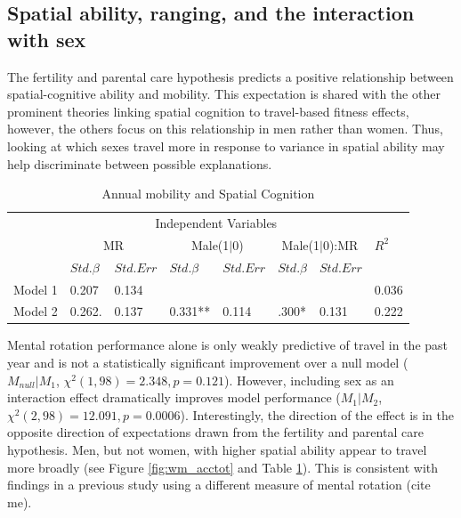 	\subsection{Spatial ability, ranging, and the interaction with sex}
	\label{sec:3.4}
The fertility and parental care hypothesis predicts a positive relationship between spatial-cognitive ability and mobility. This expectation is shared with the other prominent theories linking spatial cognition to travel-based fitness effects, however, the others focus on this relationship in men rather than women.  Thus, looking at which sexes travel more in response to variance in spatial ability may help discriminate between possible explanations.	

\begin{table}[!tb]
\caption {Annual mobility and Spatial Cognition}
\label{tab:wm_spacemob}
  \centering
  \begin{tabular}{| l  ll  ll  ll  l |} 
    \hline   
  & \multicolumn{6}{c}{Independent Variables}& \\    
  & \multicolumn{2}{c}{MR} & \multicolumn{2}{c}{Male(1$|$0)} & \multicolumn{2}{c}{Male(1$|$0):MR} & $R^2$ \\
  & $Std. \beta$ & $Std. Err$ & $Std. \beta$ & $Std. Err$ & $Std. \beta$ & $Std. Err$  & \\
  Model 1 & 0.207\phantom{**} & 0.134\phantom{**} & & & & & 0.036\phantom{**} \\
  Model 2 & 0.262. & 0.137\phantom{**} & 0.331** & 0.114\phantom{**} & .300* & 0.131\phantom{**} & 0.222\\
  \hline 
  \end{tabular}  
{}
\end{table}

Mental rotation performance alone is only weakly predictive of travel in the past year and is not a statistically significant improvement over a null model ($M_{null} | M_1$, $\chi^2(1, 98) = 2.348, p = 0.121$).  However, including sex as an interaction effect dramatically improves model performance ($M_1 | M_2$, $\chi^2(2, 98) = 12.091, p = 0.0006$).  Interestingly, the direction of the effect is in the opposite direction of expectations drawn from the fertility and parental care hypothesis.  Men, but not women, with higher spatial ability appear to travel more broadly (see Figure \ref{fig:wm_acctot} and Table \ref{tab:wm_spacemob}).  This is consistent with findings in a previous study using a different measure of mental rotation (cite me).

